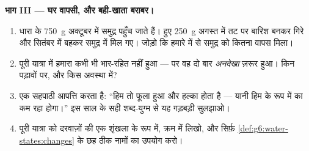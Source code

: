 \begin{problem}
\medskip\noindent\textbf{भाग III --- घर वापसी, और बही-खाता
बराबर।}
\begin{enumerate}[resume]
  \item धारा के \qty{750}{g} अक्टूबर में समुद्र पहुँच जाते हैं।
         हुए \qty{250}{g} अगस्त में तट पर बारिश बनकर गिरे और
        सितंबर में बहकर समुद्र में मिल गए। जोड़ो कि हमारे 
        में से समुद्र को कितना वापस मिला।
  \item पूरी यात्रा में हमारा  कभी भी भार-रहित नहीं हुआ ---
        पर वह दो बार \emph{अनदेखा} ज़रूर हुआ। किन पड़ावों पर, और
        किस अवस्था में?
  \item एक सहपाठी आपत्ति करता है: ``हिम तो फूला हुआ और हल्का होता है
        --- यानी हिम के रूप में  का  कम रहा होगा।'' इस
        साल के सही शब्द-युग्म से यह गड़बड़ी सुलझाओ।
  \item पूरी यात्रा को दरवाज़ों की एक शृंखला के रूप में, क्रम में
        लिखो, और सिर्फ़ \cref{def:g6:water-states:changes} के छह
        ठीक नामों का उपयोग करो।
\end{enumerate}
\end{problem}
